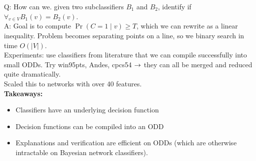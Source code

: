 Q: How can we. given two subclassifiers $B_1$ and $B_2$, identify  if $\forall_{v \in V} B_1(v) = B_2(v)$. \\

A: Goal is to compute $\Pr(C = 1 \mid v) \geq T$, which we can rewrite as a linear inequality. Problem becomes separating points on a line, so we binary search in time $O(|V|)$. \\

Experiments: use classifiers from literature that we can compile successfully into small ODDs. Try win95pts, Andes, cpcs54 $\rightarrow$ they can all be merged and reduced quite dramatically. \\

Scaled this to networks with over 40 features. \\

{\bf Takeaways:}
\begin{itemize}
    \item Classifiers have an underlying decision function
    \item Decision functions can be compiled into an ODD
    \item Explanations and verification are efficient on ODDs (which are otherwise intractable on Bayesian network classifiers).
\end{itemize}